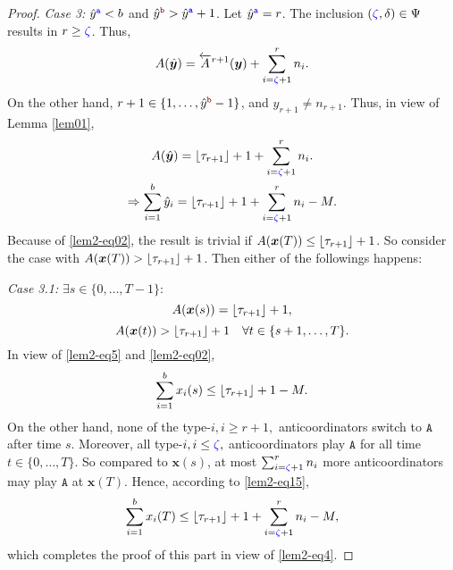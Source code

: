 \documentclass[10 pt,twocolumn,journal]{IEEEtran}
\DeclarePairedDelimiter{\floor}{\lfloor}{\rfloor}
\theoremstyle{plain}
\newcommand{\A}{\mathcal{A}}
\newcommand{\x}{\bm{x}}
\newcommand{\y}{\bm{y}}
\renewcommand{\r}{\tb{\zeta}}
\renewcommand{\d}{{\delta}}
\newcommand{\n}{\tb{\mathtt{a}}}
\renewcommand{\o}{\tr{\mathtt{b}}}
\renewcommand{\A}{\mathtt{A}}
\newcommand{\tb}{\textcolor{blue}}
\newcommand{\tr}{\textcolor{Myred}}
\theoremstyle{definition}
\begin{document}
\begin{proof}
    \emph{Case 3:} $\hat{y}^{\n} < b$ and $\hat{y}^{\o}>\hat{y}^{\n}+1$. 
    Let $\hat{y}^{\n} = r$.
    The inclusion $(\r,\d)\in\Psi$ results in $r\geq \r$.
    Thus, 
    \begin{equation*}
        A(\hat{\y}) 
        = \overleftarrow{A}^{r+1}(\y)  + \sum_{i = \r+1}^{r} n_i.
    \end{equation*}
    On the other hand, $r+1\in\{1,\ldots,\hat{y}^{\o}-1\}$, and $\hat{y}_{r+1}\neq n_{r+1}$.
    Thus, in view of Lemma \ref{lem01},
    \begin{gather}
        A(\hat{\y}) 
        = \floor{\tau_{r+1}}+1 + \sum_{i = \r+1}^{r} n_i.\nonumber\\
        \Rightarrow
        \sum_{i=1}^b \hat{y}_i
        = \floor{\tau_{r+1}}+1 + \sum_{i = \r+1}^{r} n_i - M.  \label{lem2-eq4}
    \end{gather}   
    Because of \eqref{lem2-eq02}, the result is trivial if $A(\x(T)) \leq \floor{\tau_{r+1}}+1$.
    So consider the case with $A(\x(T)) > \floor{\tau_{r+1}} + 1$.
    Then either of the followings happens:
    
    \emph{Case 3.1:} $\exists s\in\{0,\ldots,T-1\}:$ 
    \begin{equation} \label{lem2-eq5}
        A(\x(s)) = \floor{\tau_{r+1}}+1,
    \end{equation}
    \begin{equation*} %
        A(\x(t)) > \floor{\tau_{r+1}}+1\quad \forall t\in\{s+1, \ldots, T\}.
    \end{equation*}
    In view of \eqref{lem2-eq5} and \eqref{lem2-eq02}, 
    \begin{equation} \label{lem2-eq15}
        \sum_{i=1}^b x_i(s) \leq \floor{\tau_{r+1}}+1 - M.
    \end{equation}
    On the other hand, none of the type-$i,i\geq r+1,$ anticoordinators switch to $\A$ after time $s$. 
    Moreover, all type-$i,i\leq \r,$ anticoordinators play $\A$ for all time $t\in\{0,\ldots, T\}$. 
    So compared to $\x(s)$, at most $\sum_{i=\r+1}^{r}n_i$ more anticoordinators may play $\A$ at $\x(T)$.
    Hence, according to \eqref{lem2-eq15},
    \begin{equation*}
        \sum_{i=1}^b x_i(T)
        \leq \floor{\tau_{r+1}} + 1+ \sum_{i = \r+1}^{r} n_i - M,
    \end{equation*}   
    which completes the proof of this part in view of \eqref{lem2-eq4}.
    

\end{proof}
\end{document}

